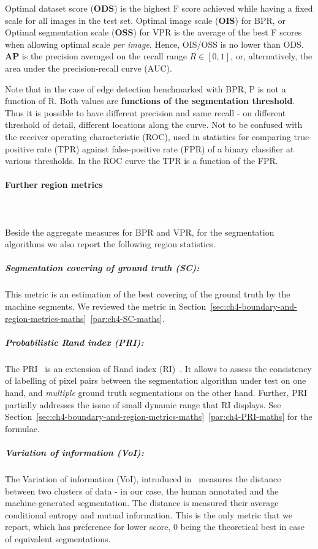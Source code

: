 Optimal dataset score ({\bf ODS}) is the highest F score achieved while having a fixed scale for all images in the test set. 
Optimal image scale ({\bf OIS}) for BPR, or Optimal segmentation scale (\textbf{OSS}) for VPR is the average of the best F scores when allowing optimal scale {\it per image}. Hence, OIS\slash OSS is no lower than ODS. 
{\bf AP} is the precision averaged on the recall range $R\in[0,1]$, or, alternatively, the area under the precision-recall curve (AUC).

Note that in the case of edge detection benchmarked with BPR, P is not a function of R. Both values are {\bf functions of the segmentation threshold}. Thus it is possible to have different precision and same recall - on different threshold of detail, \ie different locations along the curve.
Not to be confused with %
the receiver operating characteristic (ROC), used in statistics for comparing true-positive rate (TPR) against false-positive rate (FPR) of a binary classifier at various thresholds. In the ROC curve the TPR %
is a function of the FPR. %

\paragraph{Further region metrics}\mbox{}\\\mbox{}\\
Beside the aggregate measures for BPR and VPR, for the segmentation algorithms we also report the following region statistics. %
\subparagraph{Segmentation covering of ground truth (SC):} This metric is an estimation of the best covering of the ground truth by the machine segments. We reviewed the metric in Section~\ref*{sec:ch4-boundary-and-region-metrics-maths}~\ref{par:ch4-SC-maths}.

\subparagraph{Probabilistic Rand index (PRI):} The PRI~\cite{UnnikrishnanPH07} is an extension of Rand index (RI)~\cite{rand1971objective}. It allows to assess the consistency of labelling of pixel pairs between the segmentation algorithm under test on one hand, and {\it multiple} ground truth segmentations on the other hand. Further, PRI partially addresses the issue of small dynamic range that RI displays. See Section~\ref*{sec:ch4-boundary-and-region-metrics-maths}~\ref{par:ch4-PRI-maths} for the formulae.

\subparagraph{Variation of information (VoI):} The Variation of information (VoI), introduced in~\cite{Meila05} measures the distance between two clusters of data - in our case, the human annotated and the machine-generated segmentation. The distance is measured \wrt %
their average conditional entropy and mutual information. This is the only metric that we report, which has preference for lower score, 0 being the theoretical best in case of equivalent segmentations.

